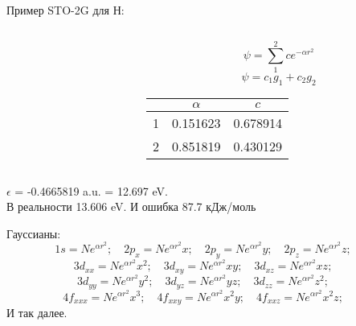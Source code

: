 \begin{frame}{Пример STO-2G для Н:}
    \begin{columns}
        \begin{column}{0.5\textwidth}
    \small{}
\end{column}
        \begin{column}{0.5\textwidth}
        \[ \psi = \sum _1 ^2 c e^{-\alpha r^2}\] 
        \[ \psi = c_1g_1 + c_2g_2 \]
\begin{tabular}{c c c} 
    \hline 
    & $\alpha$ & $c$ \\
    \hline
  1 & 0.151623 & 0.678914 \\
  2 & 0.851819 & 0.430129 \\
    \hline
\end{tabular}
\end{column}
\end{columns}
\small$\epsilon$ = -0.4665819 a.u. = 12.697 eV. \\В реальности 13.606 eV. И ошибка 87.7 кДж/моль
\end{frame}

\begin{frame}{Гауссианы:}
\[
    1s=Ne^{\alpha r^2} ;   \quad 
    2p_x=Ne^{\alpha r^2}x; \quad
    2p_y=Ne^{\alpha r^2}y; \quad
    2p_z=Ne^{\alpha r^2}z; \quad
\]
\[
    3d_{xx}=Ne^{\alpha r^2}x^2;  \quad
    3d_{xy}=Ne^{\alpha r^2}xy;   \quad
    3d_{xz}=Ne^{\alpha r^2}xz;   \quad
\]                             
\[    
    3d_{yy}=Ne^{\alpha r^2}y^2;  \quad
    3d_{yz}=Ne^{\alpha r^2}yz ;  \quad
    3d_{zz}=Ne^{\alpha r^2}z^2;  \quad
\]
\[
4f_{xxx}=Ne^{\alpha r^2}x^3   ; \quad
4f_{xxy}=Ne^{\alpha r^2}x^{2}y; \quad
4f_{xxz}=Ne^{\alpha r^2}x^{2}z; \quad
\]
И так далее.
\end{frame}

